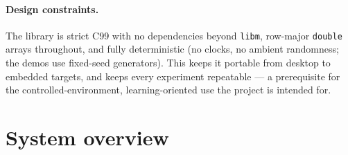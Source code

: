 \documentclass[11pt]{article}
\theoremstyle{definition}
\newcommand{\code}[1]{\texttt{#1}}
\begin{document}
\paragraph{Design constraints.} The library is strict C99 with no
dependencies beyond \code{libm}, row-major \code{double} arrays throughout,
and fully deterministic (no clocks, no ambient randomness; the demos use
fixed-seed generators). This keeps it portable from desktop to embedded
targets, and keeps every experiment repeatable --- a prerequisite for the
controlled-environment, learning-oriented use the project is intended for.

\section{System overview}
\label{sec:overview}
\end{document}
